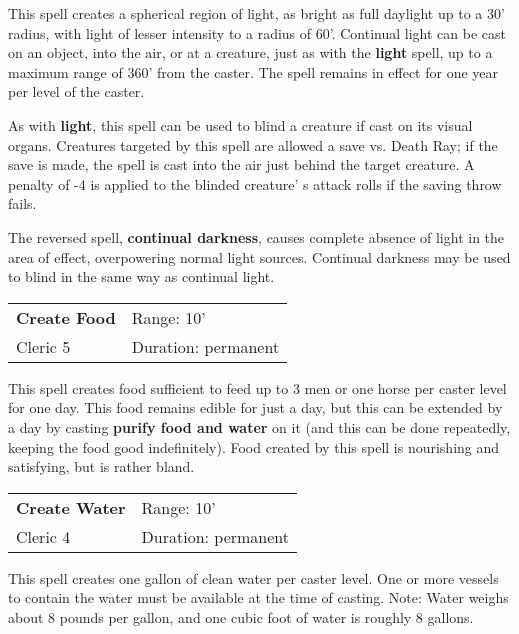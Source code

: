 \documentclass[a4paper,twoside,openany,10pt]{book}
\begin{document}
\begin{multicols}{2}
This spell creates a spherical region of light, as bright as full daylight up to a 30'{} radius, with light of lesser intensity to a radius of 60'. Continual light can be cast on an object, into the air, or at a creature, just as with the \textbf{light} spell, up to a maximum range of 360' from the caster. The spell remains in effect for one year per level of the caster.

As with \textbf{light}, this spell can be used to blind a creature if cast on its visual organs. Creatures targeted by this spell are allowed a save vs. Death Ray; if the save is made, the spell is cast into the air just behind the target creature. A penalty of -4 is applied to the blinded creature' s attack rolls if the saving throw fails.

The reversed spell, \textbf{continual darkness}, causes complete absence of light in the area of effect, overpowering normal light sources. Continual darkness may be used to blind in the same way as continual light.

\smallskip\begin{flushleft} 
	\begin{tabularx}{0.45\textwidth}{@{}m{3.5cm}m{5.5cm}@{}} 
		\textbf{Create Food} & Range: 10'\\
		Cleric 5 &Duration: permanent\\
	\end{tabularx}\end{flushleft}

This spell creates food sufficient to feed up to 3 men or one horse per caster level for one day. This food remains edible for just a day, but this can be extended by a day by casting \textbf{purify food and water} on it (and this can be done repeatedly, keeping the food good indefinitely). Food created by this spell is nourishing and satisfying, but is rather bland.

\smallskip\begin{flushleft} 
	\begin{tabularx}{0.45\textwidth}{@{}m{3.5cm}m{5.5cm}@{}} 
		\textbf{Create Water} & Range: 10'\\
		Cleric 4 &Duration: permanent\\
	\end{tabularx}\end{flushleft}

This spell creates one gallon of clean water per caster level. One or more vessels to contain the water must be available at the time of casting. Note: Water weighs about 8 pounds per gallon, and one cubic foot of water is roughly 8 gallons.


\end{multicols}
\end{document}
